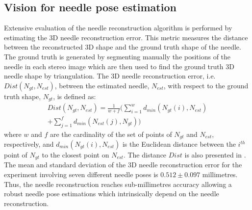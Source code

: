 \begin{figure}
\end{figure}

\subsection{Vision for needle pose estimation}
Extensive evaluation of the needle reconstruction algorithm is performed by estimating the 3D needle reconstruction error. This metric measures the distance between the reconstructed 3D shape and the ground truth shape of the needle. The ground truth is generated by segmenting manually the positions of the needle in each stereo image which are then used to find the ground truth 3D needle shape by triangulation. The 3D needle reconstruction error, i.e. $Dist(N_{gt}, N_{est})$, between the estimated needle, $N_{est}$, with respect to the ground truth shape, $N_{gt}$, is defined as:
\begin{eqnarray}
Dist(N_{gt}, N_{est}) = \frac{1}{w + f} \Biggl( \sum_{i=1}^{w} d_{min}(N_{gt}(i), N_{est}) \nonumber \\
+ \sum_{j=1}^{f} d_{min}(N_{est}(j), N_{gt}) \Biggr)
\end{eqnarray}
where $w$ and $f$ are the cardinality of the set of points of $N_{gt}$ and $N_{est}$, respectively, and $d_{min}(N_{gt}(i), N_{est})$ is the Euclidean distance between the $i^{th}$ point of $N_{gt}$ to the closest point on $N_{est}$. The distance $Dist$ is also presented in \cite{Walsum2005}. The mean and standard deviation of the 3D needle reconstruction error for the experiment involving seven different needle poses is $0.512 \pm 0.097$ millimetres. Thus, the needle reconstruction reaches sub-millimetres accuracy allowing a robust needle pose estimations which intrinsically depend on the needle reconstruction. 